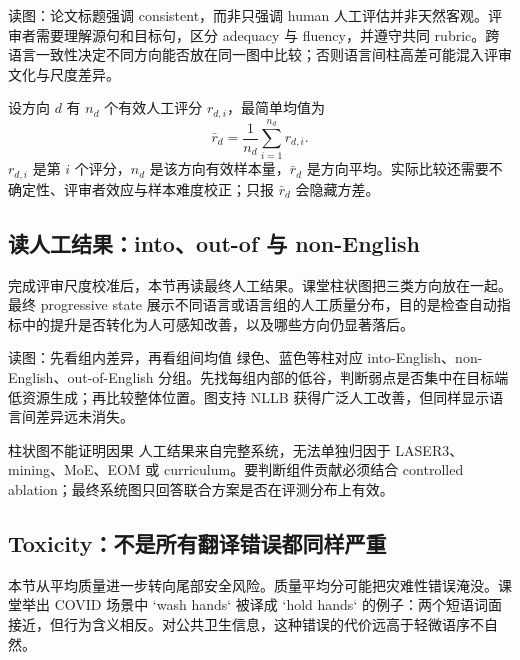 \begin{knowledgebox}{读图：论文标题强调 consistent，而非只强调 human}
人工评估并非天然客观。评审者需要理解源句和目标句，区分 adequacy 与 fluency，并遵守共同 rubric。跨语言一致性决定不同方向能否放在同一图中比较；否则语言间柱高差可能混入评审文化与尺度差异。
\end{knowledgebox}

设方向 $d$ 有 $n_d$ 个有效人工评分 $r_{d,i}$，最简单均值为
\[
\bar r_d=\frac{1}{n_d}\sum_{i=1}^{n_d}r_{d,i}.
\]
$r_{d,i}$ 是第 $i$ 个评分，$n_d$ 是该方向有效样本量，$\bar r_d$ 是方向平均。实际比较还需要不确定性、评审者效应与样本难度校正；只报 $\bar r_d$ 会隐藏方差。

\subsection{读人工结果：into、out-of 与 non-English}

完成评审尺度校准后，本节再读最终人工结果。课堂柱状图把三类方向放在一起。最终 progressive state 展示不同语言或语言组的人工质量分布，目的是检查自动指标中的提升是否转化为人可感知改善，以及哪些方向仍显著落后。


\begin{knowledgebox}{读图：先看组内差异，再看组间均值}
绿色、蓝色等柱对应 into-English、non-English、out-of-English 分组。先找每组内部的低谷，判断弱点是否集中在目标端低资源生成；再比较整体位置。图支持 NLLB 获得广泛人工改善，但同样显示语言间差异远未消失。
\end{knowledgebox}

\begin{warningbox}{柱状图不能证明因果}
人工结果来自完整系统，无法单独归因于 LASER3、mining、MoE、EOM 或 curriculum。要判断组件贡献必须结合 controlled ablation；最终系统图只回答联合方案是否在评测分布上有效。
\end{warningbox}

\subsection{Toxicity：不是所有翻译错误都同样严重}

本节从平均质量进一步转向尾部安全风险。质量平均分可能把灾难性错误淹没。课堂举出 COVID 场景中 `wash hands` 被译成 `hold hands` 的例子：两个短语词面接近，但行为含义相反。对公共卫生信息，这种错误的代价远高于轻微语序不自然。

